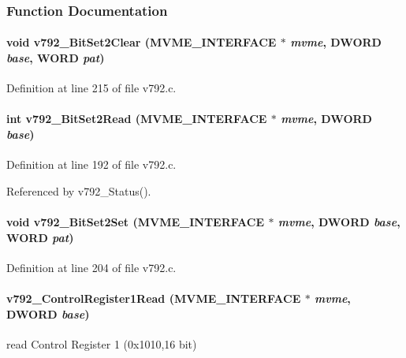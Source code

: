 \subsubsection{Function Documentation}
\paragraph[{v792\_\-BitSet2Clear}]{\setlength{\rightskip}{0pt plus 5cm}void v792\_\-BitSet2Clear ({\bf MVME\_\-INTERFACE} $\ast$ {\em mvme}, \/  {\bf DWORD} {\em base}, \/  {\bf WORD} {\em pat})}\hfill\label{v792_8c_a42d8b6663477fddc91c9a0eb7791a459}


Definition at line 215 of file v792.c.
\paragraph[{v792\_\-BitSet2Read}]{\setlength{\rightskip}{0pt plus 5cm}int v792\_\-BitSet2Read ({\bf MVME\_\-INTERFACE} $\ast$ {\em mvme}, \/  {\bf DWORD} {\em base})}\hfill\label{v792_8c_ac7a33ef538da1556c4a1ad45e2fc2783}


Definition at line 192 of file v792.c.

Referenced by v792\_\-Status().
\paragraph[{v792\_\-BitSet2Set}]{\setlength{\rightskip}{0pt plus 5cm}void v792\_\-BitSet2Set ({\bf MVME\_\-INTERFACE} $\ast$ {\em mvme}, \/  {\bf DWORD} {\em base}, \/  {\bf WORD} {\em pat})}\hfill\label{v792_8c_a9c71ef67754b6e4b0f319206d75c19ec}


Definition at line 204 of file v792.c.
\paragraph[{v792\_\-ControlRegister1Read}]{ v792\_\-ControlRegister1Read ({\bf MVME\_\-INTERFACE} $\ast$ {\em mvme}, \/  {\bf DWORD} {\em base})}\hfill\label{v792_8c_ab4e2ce6a3f923e95a23d9e6990265b8d}
read Control Register 1 (0x1010,16 bit) 

